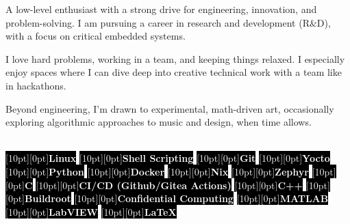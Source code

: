 \documentclass[9pt]{./src/packages/Developer_CV/developercv}
\begin{document}
\vspace{-0.3cm} %
\noindent %
\begin{minipage}[t]{0.60\textwidth} %
    \raggedright

    A low-level enthusiast with a strong drive for engineering,
    innovation, and problem-solving. I am pursuing a career in research and
    development (R\&D), with a focus on critical embedded systems.

    I love hard problems, working in a team, and keeping things relaxed.
    I especially enjoy spaces where I can dive deep into creative technical work
    with a team like in hackathons.

    Beyond engineering, I’m drawn to experimental, math-driven art, occasionally
    exploring algorithmic approaches to music and design, when time allows.

\end{minipage}
\hfill %
\begin{minipage}[t]{0.35\textwidth}
    \raggedright %
    \\
    \colorbox{black}{\textcolor{white}{\raisebox{0.5ex}[10pt][0pt]{\textbf{Linux}}}}
    \colorbox{black}{\textcolor{white}{\raisebox{0.5ex}[10pt][0pt]{\textbf{Shell Scripting}}}}
    \colorbox{black}{\textcolor{white}{\raisebox{0.5ex}[10pt][0pt]{\textbf{Git}}}}
    \colorbox{black}{\textcolor{white}{\raisebox{0.5ex}[10pt][0pt]{\textbf{Yocto}}}}
    \colorbox{black}{\textcolor{white}{\raisebox{0.5ex}[10pt][0pt]{\textbf{Python}}}}
    \colorbox{black}{\textcolor{white}{\raisebox{0.5ex}[10pt][0pt]{\textbf{Docker}}}}
    \colorbox{black}{\textcolor{white}{\raisebox{0.5ex}[10pt][0pt]{\textbf{Nix}}}}
    \colorbox{black}{\textcolor{white}{\raisebox{0.5ex}[10pt][0pt]{\textbf{Zephyr}}}}
    \colorbox{black}{\textcolor{white}{\raisebox{0.5ex}[10pt][0pt]{\textbf{C}}}}
    \colorbox{black}{\textcolor{white}{\raisebox{0.5ex}[10pt][0pt]{\textbf{CI/CD (Github/Gitea Actions)}}}}
    \colorbox{black}{\textcolor{white}{\raisebox{0.5ex}[10pt][0pt]{\textbf{C++}}}}
    \colorbox{black}{\textcolor{white}{\raisebox{0.5ex}[10pt][0pt]{\textbf{Buildroot}}}}
    \colorbox{black}{\textcolor{white}{\raisebox{0.5ex}[10pt][0pt]{\textbf{Confidential Computing}}}}
    \colorbox{black}{\textcolor{white}{\raisebox{0.5ex}[10pt][0pt]{\textbf{MATLAB}}}}
    \colorbox{black}{\textcolor{white}{\raisebox{0.5ex}[10pt][0pt]{\textbf{LabVIEW}}}}
    \colorbox{black}{\textcolor{white}{\raisebox{0.5ex}[10pt][0pt]{\textbf{LaTeX}}}}
    \\
\end{minipage}
\end{document}
